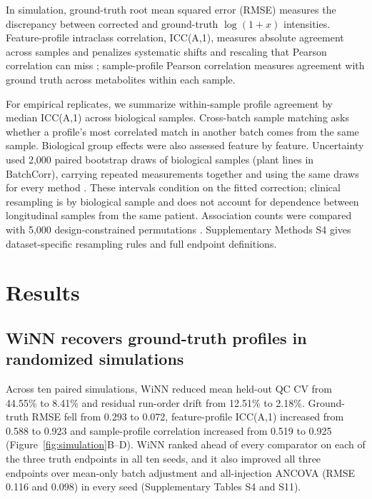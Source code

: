 \documentclass[namedate,webpdf,modern,large,nocrop]{oup-authoring-template}
\begin{document}
In simulation, ground-truth root mean squared error (RMSE) measures the discrepancy between corrected and ground-truth $\log(1+x)$ intensities. Feature-profile intraclass correlation, ICC(A,1), measures absolute agreement across samples and penalizes systematic shifts and rescaling that Pearson correlation can miss \citep{McGrawWong1996}; sample-profile Pearson correlation measures agreement with ground truth across metabolites within each sample.

For empirical replicates, we summarize within-sample profile agreement by median ICC(A,1) across biological samples. Cross-batch sample matching asks whether a profile's most correlated match in another batch comes from the same sample. Biological group effects were also assessed feature by feature. Uncertainty used 2,000 paired bootstrap draws of biological samples (plant lines in BatchCorr), carrying repeated measurements together and using the same draws for every method \citep{EfronTibshirani1993}. These intervals condition on the fitted correction; clinical resampling is by biological sample and does not account for dependence between longitudinal samples from the same patient. Association counts were compared with 5,000 design-constrained permutations \citep{FreedmanLane1983}. Supplementary Methods S4 gives dataset-specific resampling rules and full endpoint definitions.

\section{Results}
\label{sec:results}

\subsection{WiNN recovers ground-truth profiles in randomized simulations}

Across ten paired simulations, WiNN reduced mean held-out QC CV from 44.55\% to 8.41\% and residual run-order drift from 12.51\% to 2.18\%. Ground-truth RMSE fell from 0.293 to 0.072, feature-profile ICC(A,1) increased from 0.588 to 0.923 and sample-profile correlation increased from 0.519 to 0.925 (Figure~\ref{fig:simulation}B--D). WiNN ranked ahead of every comparator on each of the three truth endpoints in all ten seeds, and it also improved all three endpoints over mean-only batch adjustment and all-injection ANCOVA (RMSE 0.116 and 0.098) in every seed (Supplementary Tables S4 and S11).
\end{document}

